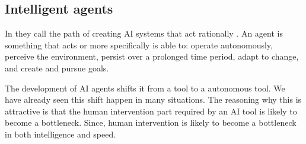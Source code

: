 \documentclass[12pt,A4]{report}
\theoremstyle{definition}
\begin{document}



\subsection{Intelligent agents}
In \autocite{Russel Norvig} they call the path of creating AI systems that act rationally . An agent is something that acts or more specifically is able to: operate autonomously, perceive the environment, persist over a prolonged time period, adapt to change, and create and pursue goals.

The development of AI agents shifts it from a tool to a autonomous tool. We have already seen this shift happen in many situations\autocite{k'lla}. The reasoning why this is attractive is that the human intervention part required by an AI tool is likely to become a bottleneck\autocite{T'nkande Maskiner}. Since, human intervention is likely to become a bottleneck in both intelligence and speed.
\end{document}
